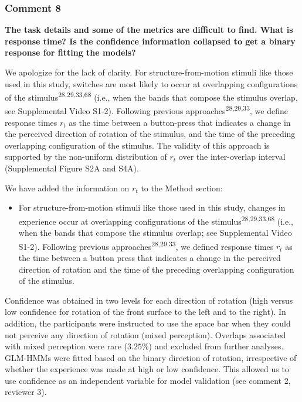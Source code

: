\documentclass[
]{article}
\providecommand{\tightlist}{%
  \setlength{\itemsep}{0pt}\setlength{\parskip}{0pt}}
\begin{document}
\subsubsection{Comment 8}\label{comment-8}

\textbf{The task details and some of the metrics are difficult to find.
What is response time? Is the confidence information collapsed to get a
binary response for fitting the models?}

We apologize for the lack of clarity. For structure-from-motion stimuli
like those used in this study, switches are most likely to occur at
overlapping configurations of the stimulus\textsuperscript{28,29,33,68}
(i.e., when the bands that compose the stimulus overlap, see
Supplemental Video S1-2). Following previous
approaches\textsuperscript{28,29,33}, we define response times \(r_t\)
as the time between a button-press that indicates a change in the
perceived direction of rotation of the stimulus, and the time of the
preceding overlapping configuration of the stimulus. The validity of
this approach is supported by the non-uniform distribution of \(r_t\)
over the inter-overlap interval (Supplemental Figure S2A and S4A).

We have added the information on \(r_t\) to the Method section:

\begin{itemize}
\tightlist
\item
  For structure-from-motion stimuli like those used in this study,
  changes in experience occur at overlapping configurations of the
  stimulus\textsuperscript{28,29,33,68} (i.e., when the bands that
  compose the stimulus overlap; see Supplemental Video S1-2). Following
  previous approaches\textsuperscript{28,29,33}, we defined response
  times \(r_t\) as the time between a button press that indicates a
  change in the perceived direction of rotation and the time of the
  preceding overlapping configuration of the stimulus.
\end{itemize}

Confidence was obtained in two levels for each direction of rotation
(high versus low confidence for rotation of the front surface to the
left and to the right). In addition, the participants were instructed to
use the space bar when they could not perceive any direction of rotation
(mixed perception). Overlaps associated with mixed perception were rare
(\(3.25\)\%) and excluded from further analyses. GLM-HMMs were fitted
based on the binary direction of rotation, irrespective of whether the
experience was made at high or low confidence. This allowed us to use
confidence as an independent variable for model validation (see comment
2, reviewer 3).
\end{document}
